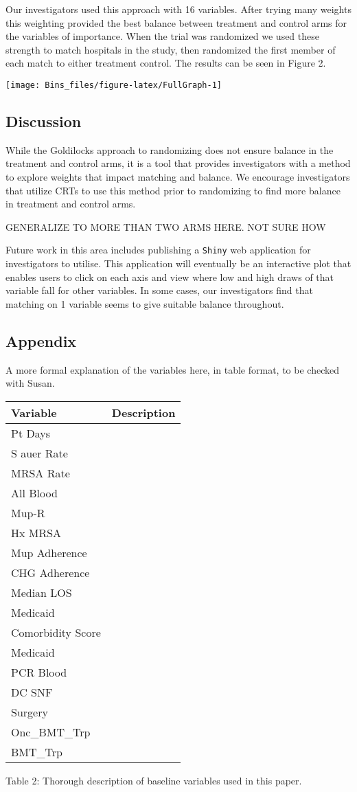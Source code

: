 \documentclass[]{sagej}
\begin{document}
Our investigators used this approach with 16 variables. After trying
many weights this weighting provided the best balance between treatment
and control arms for the variables of importance. When the trial was
randomized we used these strength to match hospitals in the study, then
randomized the first member of each match to either treatment control.
The results can be seen in Figure 2.

\begin{center}\texttt{[image: Bins\_files/figure-latex/FullGraph-1]} \end{center}

\subsection{Discussion}\label{discussion}

While the Goldilocks approach to randomizing does not ensure balance in
the treatment and control arms, it is a tool that provides investigators
with a method to explore weights that impact matching and balance. We
encourage investigators that utilize CRTs to use this method prior to
randomizing to find more balance in treatment and control arms.

GENERALIZE TO MORE THAN TWO ARMS HERE. NOT SURE HOW

Future work in this area includes publishing a \texttt{Shiny} web
application for investigators to utilise. This application will
eventually be an interactive plot that enables users to click on each
axis and view where low and high draws of that variable fall for other
variables. In some cases, our investigators find that matching on 1
variable seems to give suitable balance throughout.

\subsection{Appendix}\label{appendix}

A more formal explanation of the variables here, in table format, to be
checked with Susan.

\begin{longtable}[]{@{}ll@{}}
\toprule
Variable & Description\tabularnewline
\midrule
\endhead
Pt Days &\tabularnewline
S auer Rate &\tabularnewline
MRSA Rate &\tabularnewline
All Blood &\tabularnewline
Mup-R &\tabularnewline
Hx MRSA &\tabularnewline
Mup Adherence &\tabularnewline
CHG Adherence &\tabularnewline
Median LOS &\tabularnewline
Medicaid &\tabularnewline
Comorbidity Score &\tabularnewline
Medicaid &\tabularnewline
PCR Blood &\tabularnewline
DC SNF &\tabularnewline
Surgery &\tabularnewline
Onc\_BMT\_Trp &\tabularnewline
BMT\_Trp &\tabularnewline
\bottomrule
\end{longtable}

Table 2: Thorough description of baseline variables used in this paper.


\end{document}
